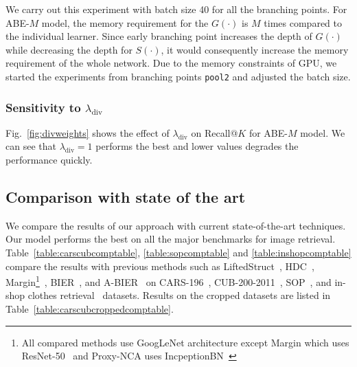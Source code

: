 \documentclass[runningheads]{llncs}
\begin{document}
We carry out this experiment with batch size 40 for all the branching points.
For ABE-$M$ model, the memory requirement for the $G(\cdot)$ is $M$ times compared to the individual learner. Since early branching point increases the depth of $G(\cdot)$ while decreasing the depth for $S(\cdot)$, it would consequently increase the memory requirement of the whole network.
Due to the memory constraints of GPU, we started the experiments from branching points  \texttt{pool2} and adjusted the batch size.


\subsubsection{Sensitivity to $\lambda_\mathrm{div}$}
Fig.~\ref{fig:divweights} shows the effect of $\lambda_\mathrm{div}$ on Recall@$K$ for ABE-$M$ model. We can see that $\lambda_\mathrm{div}=1$ performs the best and lower values degrades the performance quickly.




\subsection{Comparison with state of the art}
We compare the results of our approach with current state-of-the-art techniques.
Our model performs the best on all the major benchmarks for image retrieval.
Table~\ref{table:carscubcomptable}, \ref{table:sopcomptable} and \ref{table:inshopcomptable} compare the results with previous methods such as LiftedStruct~\cite{oh2016deep}, HDC~\cite{yuan2016hard}, Margin\footnote[2]{\label{note1}All compared methods use GoogLeNet architecture except Margin which uses ResNet-50~\cite{he2016deep}  and Proxy-NCA uses IncpeptionBN~\cite{ioffe2015batch}}~\cite{wu2017sampling}, BIER~\cite{opitz2017bier}, and A-BIER~\cite{opitz2017bier} on CARS-196~\cite{KrauseStarkDengFei-Fei_3DRR2013}, CUB-200-2011~\cite{WahCUB_200_2011}, SOP~\cite{oh2016deep}, and in-shop clothes retrieval~\cite{liu2016deepfashion} datasets.
Results on the cropped datasets are listed in Table~\ref{table:carscubcroppedcomptable}.
\end{document}
